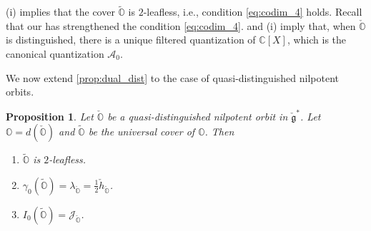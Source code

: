 \documentclass[11pt, a4paper]{amsart}
\newcommand{\C}{\mathbb{C}}
\newcommand{\J}{\mathcal{J}}
\newcommand{\orb}{\mathbb{O}}
\newcommand{\fg}{\mathfrak{g}}
\newcommand{\ckfg}{{\check{\fg}}}
\newcommand{\ckorb}{\check{\orb}}
\newcommand{\cA}{\mathcal{A}}
\newtheorem{Prop}[Thm]{Proposition}
\theoremstyle{definition}
\numberwithin{equation}{section}
\begin{document}
 (i) implies that the cover $\widetilde{\orb}$ is $2$-leafless, i.e., condition \eqref{eq:codim_4} holds. Recall that our  has strengthened the condition \eqref{eq:codim_4}.  and  (i) imply that, when $\ckorb$ is distinguished, there is a unique filtered quantization of $\C[X]$, which is the canonical quantization $\cA_0$. 

We now extend \cref{prop:dual_dist} to the case of quasi-distinguished nilpotent orbits.

\begin{Prop}\label{prop:dual_quasi-dist}
    Let $\ckorb$ be a quasi-distinguished nilpotent orbit in $\ckfg^*$. Let $\orb = d(\ckorb)$ and $\widetilde{\orb}$ be the universal cover of $\orb$. Then 
	\begin{enumerate}[label=(\roman*), leftmargin=*]
			\item $\widetilde{\orb}$ is $2$-leafless.
		\item $\gamma_0(\widetilde{\orb}) = \lambda_{\ckorb} = \frac{1}{2}\check{h}_{\ckorb}$.
		\item $I_0(\widetilde{\orb}) = \J_{\ckorb}$.
	\end{enumerate}
\end{Prop}
\end{document}
